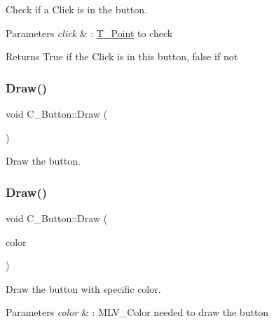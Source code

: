 Check if a Click is in the button. 


\begin{DoxyParams}{Parameters}
{\em click} & \+: \hyperlink{classT__Point}{T\+\_\+\+Point} to check \\
\hline
\end{DoxyParams}
\begin{DoxyReturn}{Returns}
True if the Click is in this button, false if not 
\end{DoxyReturn}
\mbox{\label{classC__Button_a71f9a7d92a30818af1539104e6b963fb}} 
\subsubsection{\texorpdfstring{Draw()}{Draw()}\hspace{0.1cm}{\footnotesize\ttfamily [1/2]}}
{\footnotesize\ttfamily void C\+\_\+\+Button\+::\+Draw (\begin{DoxyParamCaption}{ }\end{DoxyParamCaption})}



Draw the button. 

\mbox{\label{classC__Button_a6c507d4567ca21676e9980f8cf3d26b5}} 
\subsubsection{\texorpdfstring{Draw()}{Draw()}\hspace{0.1cm}{\footnotesize\ttfamily [2/2]}}
{\footnotesize\ttfamily void C\+\_\+\+Button\+::\+Draw (\begin{DoxyParamCaption}\item[{M\+L\+V\+\_\+\+Color}]{color }\end{DoxyParamCaption})}



Draw the button with specific color. 


\begin{DoxyParams}{Parameters}
{\em color} & \+: M\+L\+V\+\_\+\+Color needed to draw the button \\
\hline
\end{DoxyParams}
\mbox{\label{classC__Button_aedb01f3229d8176f6a9475cf2edae8f0}} 
